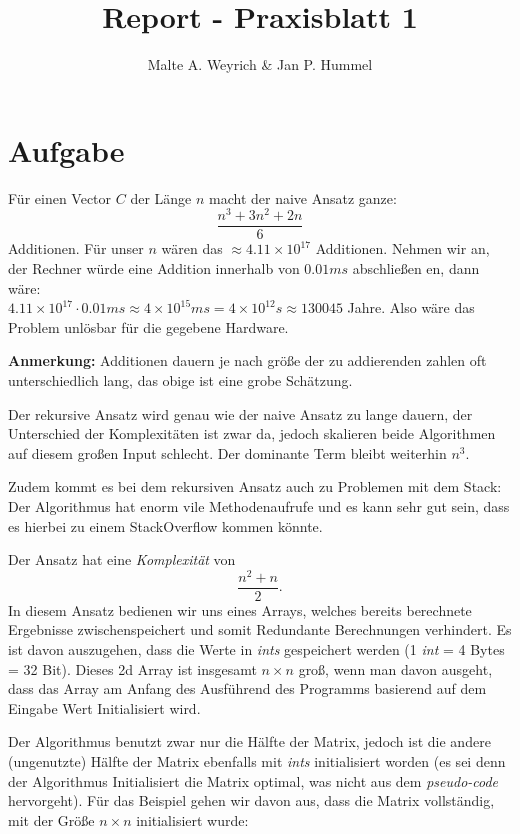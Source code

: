 \documentclass[10pt]{article}
\title{Report - Praxisblatt 1}
\author{Malte A. Weyrich & Jan P. Hummel}
\begin{document}
\maketitle
\section{Aufgabe}

    Für einen Vector $C$ der Länge $n$ macht der naive Ansatz ganze:
    \[
        \frac{n^{3}+3n^{2}+2n}{6} 
    \]
    Additionen. 
    Für unser $n$ wären das $\approx 4.11 \times 10^{17}$ Additionen. 
    Nehmen wir an, der Rechner würde eine Addition innerhalb von $0.01 ms$ abschlie\ss en en,
    dann wäre:\\
    $4.11 \times 10^{17} \cdot 0.01ms \approx 4 \times 10^{15} ms = 4 \times 10^{12} s \approx 130 045$ Jahre.
    Also wäre das Problem unlösbar für die gegebene Hardware.

    
    \textbf{Anmerkung:} 
    Additionen dauern je nach grö\ss e der zu addierenden zahlen oft unterschiedlich lang, das obige ist eine grobe
    Schätzung.

    Der rekursive Ansatz wird genau wie der naive Ansatz zu lange dauern, der Unterschied der Komplexitäten ist 
    zwar da, jedoch skalieren beide Algorithmen auf diesem gro\ss en Input schlecht. Der dominante Term bleibt weiterhin
    $n^{3}$.

    Zudem kommt es bei dem rekursiven Ansatz auch zu Problemen mit dem Stack:
    Der Algorithmus hat enorm vile Methodenaufrufe und es kann sehr gut sein, dass es hierbei
    zu einem StackOverflow kommen könnte.

    Der Ansatz hat eine \textit{Komplexität} von
    \[
        \frac{n^{2}+n}{2} 
    .\]
    In diesem Ansatz bedienen wir uns eines Arrays, welches bereits berechnete Ergebnisse zwischenspeichert und somit
    Redundante Berechnungen verhindert. Es ist davon auszugehen, dass die Werte in \textit{ints} gespeichert werden 
    (1 \textit{int} = 4 Bytes = 32 Bit). Dieses 2d Array ist insgesamt $n \times n$ gro\ss, wenn man davon ausgeht,
    dass das Array am Anfang des Ausführend des Programms basierend auf dem Eingabe Wert Initialisiert wird.

    Der Algorithmus benutzt zwar nur die Hälfte der Matrix, jedoch ist die andere (ungenutzte) Hälfte der Matrix ebenfalls
    mit \textit{ints} initialisiert worden (es sei denn der Algorithmus Initialisiert die Matrix optimal, was nicht aus 
    dem \textit{pseudo-code} hervorgeht). 
    Für das Beispiel gehen wir davon aus, dass die Matrix vollständig, mit der Grö\ss e $n \times n$ initialisiert wurde: \\
\end{document}
